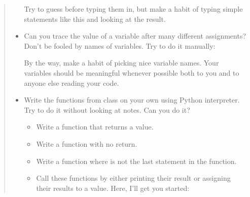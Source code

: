 \documentclass[letterpaper,10pt,english]{sphinxmanual}
\begin{document}
\begin{quote}
\begin{itemize}
Try to guess before typing them in, but make a habit of typing simple
statements like this and looking at the result.

\item {} 
 Can you trace the value of a variable after many
different assignments? Don’t be fooled by names of variables.
Try to do it manually:

\begin{sphinxVerbatim}[commandchars=\\\{\}]
  
  
  
    
      
\end{sphinxVerbatim}

By the way, make a habit of picking nice variable names.  Your
variables should be meaningful whenever possible both to you and to
anyone else reading your code.

\item {} 
 Write the functions from class on your own using
Python interpreter. Try to do it without looking at
notes. Can you do it?
\begin{itemize}
\item {} 
Write a function that returns a value.

\item {} 
Write a function with no return.

\item {} 
Write a function where  is not the last statement in the
function.

\item {} 
Call these functions by either printing their result or assigning
their results to a value. Here, I’ll get you started:

\end{itemize}

\begin{sphinxVerbatim}[commandchars=\\\{\}]
 
       


\end{sphinxVerbatim}
\end{itemize}
\end{quote}
\end{document}
